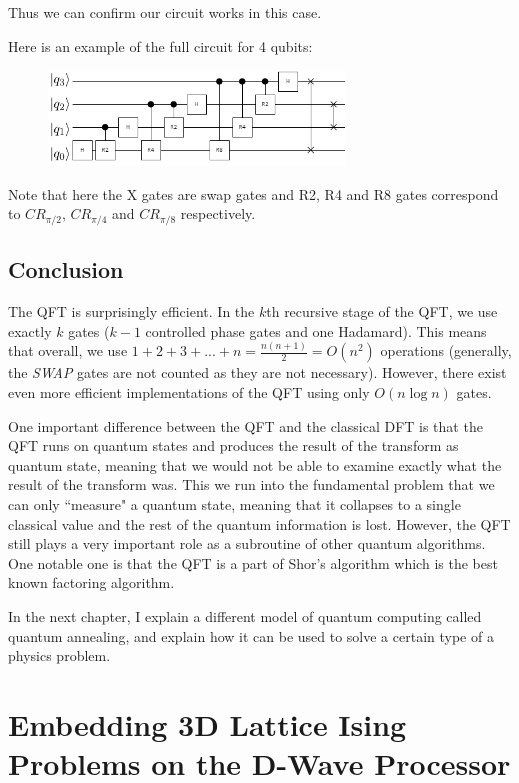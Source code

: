 \documentclass[11pt]{report}
\newcommand{\?}{\stackrel{?}{=}}
\begin{document}
Thus we can confirm our circuit works in this case.

Here is an example of the full circuit for 4 qubits:
\begin{figure}[h]
\centering
\includegraphics[width=0.7\textwidth]{resources/images/qft4.png}
\end{figure}
Note that here the X gates are swap gates and R2, R4 and R8 gates correspond to $CR_{\pi/2}$, $CR_{\pi/4}$ and $CR_{\pi/8}$ respectively.

\section{Conclusion}
The QFT is surprisingly efficient. In the $k$th recursive stage of the QFT, we use exactly $k$ gates ($k-1$ controlled phase gates and one Hadamard). This means that overall, we use $1 + 2 + 3 + ... + n = \frac{n(n+1)}{2} = O(n^2)$ operations (generally, the \textit{SWAP} gates are not counted as they are not necessary). However, there exist even more efficient implementations of the QFT using only $O(n\log n)$ gates.

One important difference between the QFT and the classical DFT is that the QFT runs on quantum states and produces the result of the transform as quantum state, meaning that we would not be able to examine exactly what the result of the transform was. This we run into the fundamental problem that we can only ``measure" a quantum state, meaning that it collapses to a single classical value and the rest of the quantum information is lost. However, the QFT still plays a very important role as a subroutine of other quantum algorithms. One notable one is that the QFT is a part of Shor's algorithm which is the best known factoring algorithm.

In the next chapter, I explain a different model of quantum computing called quantum annealing, and explain how it can be used to solve a certain type of a physics problem.

\chapter{Embedding 3D Lattice Ising Problems on the D-Wave Processor}
\end{document}
